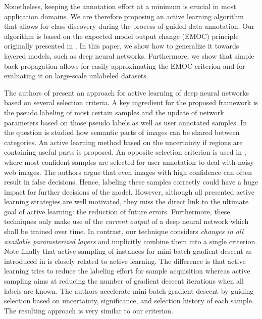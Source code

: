 \documentclass{article}
\begin{document}
Nonetheless, keeping the annotation effort at a minimum is crucial in most application domains. %
We are therefore proposing an active learning algorithm that allows for class discovery during the process of guided data annotation.
Our algorithm is based on the expected model output change (EMOC) principle originally presented
in \cite{Freytag14_SIE,Kaeding15_ALD}.
In this paper,
we show how to generalize it towards layered models, such as deep neural networks. Furthermore, we show
that simple back-propagation allows for easily approximating the EMOC criterion and for evaluating it on large-scale unlabeled datasets.


The authors of \cite{wang2016cost} present an approach for active learning of deep neural networks based on several selection criteria.
A key ingredient for the proposed framework is the pseudo labeling of most certain samples and the update of network parameters based on those pseudo labels as well as user annotated samples.
In \cite{novotny16i-have} the question is studied how semantic parts of images can be shared between categories.
An active learning method based on the uncertainty if regions are containing useful parts is proposed.
An opposite selection criterion is used in \cite{krause2015unreasonable},
where most confident samples are selected for user annotation to deal with noisy web images.
The authors argue that even images with high confidence can often result in false decisions.
Hence, labeling these samples correctly could have a huge impact for further decisions of the model.
However,
although all presented active learning strategies are well motivated,
they miss the direct link to the ultimate goal of active learning: the reduction of future errors.
%
Furthermore,
these techniques only make use of the  \emph{current output} of a deep neural network which shall be trained over time.
In contrast,
our technique considers \emph{changes in all available parameterized layers} and implicitly combine them into a single criterion.
Note finally that active sampling of instances for mini-batch gradient descent as introduced in \cite{gao2015active} is closely related to active learning.
The difference is that active learning tries to reduce the labeling effort for sample acquisition whereas active sampling aims at reducing the number of gradient descent iterations when all labels are known.
The authors accelerate mini-batch gradient descent by guiding selection based on uncertainty, significance, and selection history of each sample.
The resulting approach is very similar to our criterion.
\end{document}
